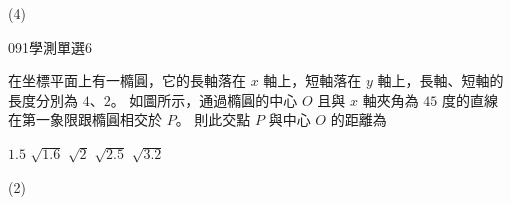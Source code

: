 \begin{QUESTIONS}
\begin{QUESTION}
        \begin{QANS}
            (4)
        \end{QANS}
        \begin{QSOLLIST}
        \end{QSOLLIST}
        \begin{QEMPTYSPACE}
        \end{QEMPTYSPACE}
    \end{QUESTION}
    \begin{QUESTION}
        \begin{ExamInfo}{091}{學測}{單選}{6}
        \end{ExamInfo}
        \begin{ExamAnsRateInfo}{33}{53}{32}{14}
        \end{ExamAnsRateInfo}
        \begin{QBODY}
            在坐標平面上有一橢圓，它的長軸落在 $x$ 軸上，短軸落在 $y$ 軸上，長軸、短軸的長度分別為 $4$、$2$。
            如圖所示，通過橢圓的中心 $O$ 且與 $x$ 軸夾角為 $45$ 度的直線在第一象限跟橢圓相交於 $P$。 則此交點 $P$ 與中心 $O$ 的距離為 
            
            
            \begin{QOPS} 
                \QOP $1.5$
                \QOP $\sqrt{1.6}$ 
                \QOP $\sqrt{2}$ 
                \QOP $\sqrt{2.5}$ 
                \QOP $
                \sqrt{3.2}$
            \end{QOPS}
        
            
        \end{QBODY}
        \begin{QFROMS}
        \end{QFROMS}
        \begin{QTAGS}\end{QTAGS}
        \begin{QANS}
            (2)
        \end{QANS}
        \begin{QSOLLIST}
        \end{QSOLLIST}
        \begin{QEMPTYSPACE}
        \end{QEMPTYSPACE}
    \end{QUESTION}
\end{QUESTIONS}
